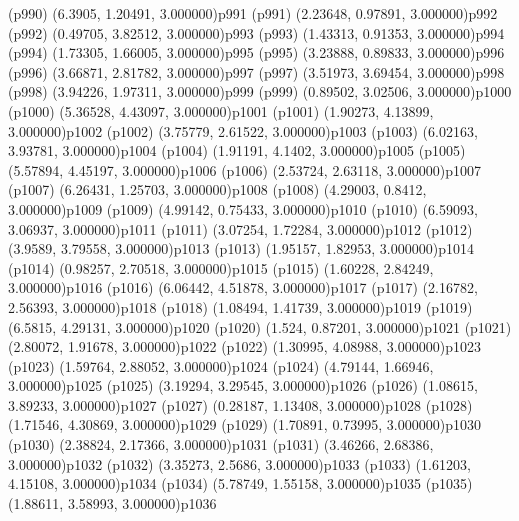 \psdot(p990)
\psPoint(6.3905, 1.20491, 3.000000){p991}
\psdot(p991)
\psPoint(2.23648, 0.97891, 3.000000){p992}
\psdot(p992)
\psPoint(0.49705, 3.82512, 3.000000){p993}
\psdot(p993)
\psPoint(1.43313, 0.91353, 3.000000){p994}
\psdot(p994)
\psPoint(1.73305, 1.66005, 3.000000){p995}
\psdot(p995)
\psPoint(3.23888, 0.89833, 3.000000){p996}
\psdot(p996)
\psPoint(3.66871, 2.81782, 3.000000){p997}
\psdot(p997)
\psPoint(3.51973, 3.69454, 3.000000){p998}
\psdot(p998)
\psPoint(3.94226, 1.97311, 3.000000){p999}
\psdot(p999)
\psPoint(0.89502, 3.02506, 3.000000){p1000}
\psdot(p1000)
\psPoint(5.36528, 4.43097, 3.000000){p1001}
\psdot(p1001)
\psPoint(1.90273, 4.13899, 3.000000){p1002}
\psdot(p1002)
\psPoint(3.75779, 2.61522, 3.000000){p1003}
\psdot(p1003)
\psPoint(6.02163, 3.93781, 3.000000){p1004}
\psdot(p1004)
\psPoint(1.91191, 4.1402, 3.000000){p1005}
\psdot(p1005)
\psPoint(5.57894, 4.45197, 3.000000){p1006}
\psdot(p1006)
\psPoint(2.53724, 2.63118, 3.000000){p1007}
\psdot(p1007)
\psPoint(6.26431, 1.25703, 3.000000){p1008}
\psdot(p1008)
\psPoint(4.29003, 0.8412, 3.000000){p1009}
\psdot(p1009)
\psPoint(4.99142, 0.75433, 3.000000){p1010}
\psdot(p1010)
\psPoint(6.59093, 3.06937, 3.000000){p1011}
\psdot(p1011)
\psPoint(3.07254, 1.72284, 3.000000){p1012}
\psdot(p1012)
\psPoint(3.9589, 3.79558, 3.000000){p1013}
\psdot(p1013)
\psPoint(1.95157, 1.82953, 3.000000){p1014}
\psdot(p1014)
\psPoint(0.98257, 2.70518, 3.000000){p1015}
\psdot(p1015)
\psPoint(1.60228, 2.84249, 3.000000){p1016}
\psdot(p1016)
\psPoint(6.06442, 4.51878, 3.000000){p1017}
\psdot(p1017)
\psPoint(2.16782, 2.56393, 3.000000){p1018}
\psdot(p1018)
\psPoint(1.08494, 1.41739, 3.000000){p1019}
\psdot(p1019)
\psPoint(6.5815, 4.29131, 3.000000){p1020}
\psdot(p1020)
\psPoint(1.524, 0.87201, 3.000000){p1021}
\psdot(p1021)
\psPoint(2.80072, 1.91678, 3.000000){p1022}
\psdot(p1022)
\psPoint(1.30995, 4.08988, 3.000000){p1023}
\psdot(p1023)
\psPoint(1.59764, 2.88052, 3.000000){p1024}
\psdot(p1024)
\psPoint(4.79144, 1.66946, 3.000000){p1025}
\psdot(p1025)
\psPoint(3.19294, 3.29545, 3.000000){p1026}
\psdot(p1026)
\psPoint(1.08615, 3.89233, 3.000000){p1027}
\psdot(p1027)
\psPoint(0.28187, 1.13408, 3.000000){p1028}
\psdot(p1028)
\psPoint(1.71546, 4.30869, 3.000000){p1029}
\psdot(p1029)
\psPoint(1.70891, 0.73995, 3.000000){p1030}
\psdot(p1030)
\psPoint(2.38824, 2.17366, 3.000000){p1031}
\psdot(p1031)
\psPoint(3.46266, 2.68386, 3.000000){p1032}
\psdot(p1032)
\psPoint(3.35273, 2.5686, 3.000000){p1033}
\psdot(p1033)
\psPoint(1.61203, 4.15108, 3.000000){p1034}
\psdot(p1034)
\psPoint(5.78749, 1.55158, 3.000000){p1035}
\psdot(p1035)
\psPoint(1.88611, 3.58993, 3.000000){p1036}
